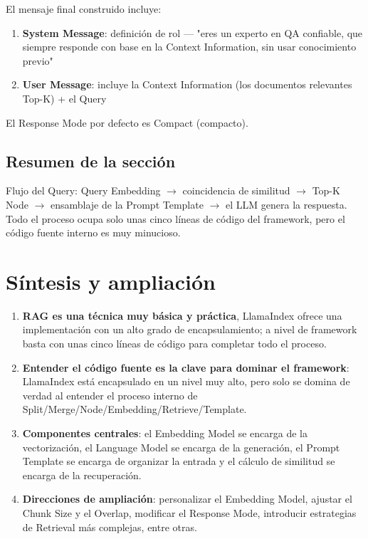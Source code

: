 \documentclass[a4paper]{article}
\begin{document}
El mensaje final construido incluye:
\begin{enumerate}
    \item \textbf{System Message}: definición de rol — "eres un experto en QA confiable, que siempre responde con base en la Context Information, sin usar conocimiento previo"
    \item \textbf{User Message}: incluye la Context Information (los documentos relevantes Top-K) + el Query
\end{enumerate}

El Response Mode por defecto es Compact (compacto).

\subsection{Resumen de la sección}

Flujo del Query: Query Embedding $\rightarrow$ coincidencia de similitud $\rightarrow$ Top-K Node $\rightarrow$ ensamblaje de la Prompt Template $\rightarrow$ el LLM genera la respuesta. Todo el proceso ocupa solo unas cinco líneas de código del framework, pero el código fuente interno es muy minucioso.

\section{Síntesis y ampliación}

\begin{enumerate}
    \item \textbf{RAG es una técnica muy básica y práctica}, LlamaIndex ofrece una implementación con un alto grado de encapsulamiento; a nivel de framework basta con unas cinco líneas de código para completar todo el proceso.
    \item \textbf{Entender el código fuente es la clave para dominar el framework}: LlamaIndex está encapsulado en un nivel muy alto, pero solo se domina de verdad al entender el proceso interno de Split/Merge/Node/Embedding/Retrieve/Template.
    \item \textbf{Componentes centrales}: el Embedding Model se encarga de la vectorización, el Language Model se encarga de la generación, el Prompt Template se encarga de organizar la entrada y el cálculo de similitud se encarga de la recuperación.
    \item \textbf{Direcciones de ampliación}: personalizar el Embedding Model, ajustar el Chunk Size y el Overlap, modificar el Response Mode, introducir estrategias de Retrieval más complejas, entre otras.
\end{enumerate}
\end{document}

